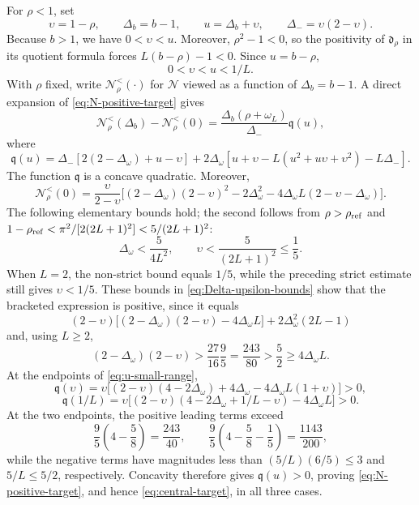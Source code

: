 \documentclass[11pt,a4paper]{article}
\numberwithin{equation}{section}
\begin{document}
For \(\rho<1\), set
\[
 \upsilon=1-\rho,\qquad \Delta_b=b-1,\qquad
 u=\Delta_b+\upsilon,\qquad \Delta_-=\upsilon(2-\upsilon).
\]
Because \(b>1\), we have \(0<\upsilon<u\).  Moreover,
\(\rho^2-1<0\), so the positivity of \(\mathfrak d_\rho\) in its quotient
formula forces \(L(b-\rho)-1<0\).  Since \(u=b-\rho\),
\begin{equation}\label{eq:u-small-range}
 0<\upsilon<u<1/L.
\end{equation}
With \(\rho\) fixed, write \(\mathcal N_\rho^{<}(\mathord\cdot)\) for
\(\mathcal N\) viewed as a function of \(\Delta_b=b-1\).
A direct expansion of \eqref{eq:N-positive-target} gives
\[
 \mathcal N_\rho^{<}(\Delta_b)-\mathcal N_\rho^{<}(0)
 =\frac{\Delta_b(\rho+\omega_L)}{\Delta_-}\mathfrak q(u),
\]
where
\[
 \mathfrak q(u)=\Delta_-[2(2-\Delta_\omega)+u-\upsilon]
 +2\Delta_\omega
 [u+\upsilon-L(u^2+u\upsilon+\upsilon^2)-L\Delta_-].
\]
The function \(\mathfrak q\) is a concave quadratic.  Moreover,
\[
 \mathcal N_\rho^{<}(0)=\frac{\upsilon}{2-\upsilon}
 \bigl[(2-\Delta_\omega)(2-\upsilon)^2
 -2\Delta_\omega^2
 -4\Delta_\omega L(2-\upsilon-\Delta_\omega)\bigr].
\]
The following elementary bounds hold; the second follows from
\(\rho>\rho_{\rm ref}\) and
\(1-\rho_{\rm ref}<\pi^2/[2(2L+1)^2]<5/(2L+1)^2\):
\begin{equation}\label{eq:Delta-upsilon-bounds}
 \Delta_\omega<\frac5{4L^2},\qquad
 \upsilon<\frac5{(2L+1)^2}\leq\frac15.
\end{equation}
When \(L=2\), the non-strict bound equals \(1/5\), while the preceding strict
estimate still gives \(\upsilon<1/5\).  These bounds
in \eqref{eq:Delta-upsilon-bounds} show that the bracketed expression is
positive, since it equals
\[
 (2-\upsilon)
 \bigl[(2-\Delta_\omega)(2-\upsilon)-4\Delta_\omega L\bigr]
 +2\Delta_\omega^2(2L-1)
\]
and, using \(L\geq2\),
\[
 (2-\Delta_\omega)(2-\upsilon)
 >\frac{27}{16}\frac95=\frac{243}{80}
 >\frac52\geq4\Delta_\omega L.
\]
At the endpoints of
\eqref{eq:u-small-range},
\[
 \mathfrak q(\upsilon)=\upsilon
 \bigl[(2-\upsilon)(4-2\Delta_\omega)
 +4\Delta_\omega-4\Delta_\omega L(1+\upsilon)\bigr]>0,
\]
\[
 \mathfrak q(1/L)=\upsilon
 \bigl[(2-\upsilon)(4-2\Delta_\omega+1/L-\upsilon)
 -4\Delta_\omega L\bigr]>0.
\]
At the two endpoints, the positive leading terms exceed
\[
 \frac95\left(4-\frac58\right)=\frac{243}{40},
 \qquad
 \frac95\left(4-\frac58-\frac15\right)=\frac{1143}{200},
\]
while the negative terms have magnitudes less than
\((5/L)(6/5)\leq3\) and \(5/L\leq5/2\), respectively.  Concavity therefore
gives \(\mathfrak q(u)>0\), proving \eqref{eq:N-positive-target}, and hence
\eqref{eq:central-target}, in all three cases.
\end{document}
